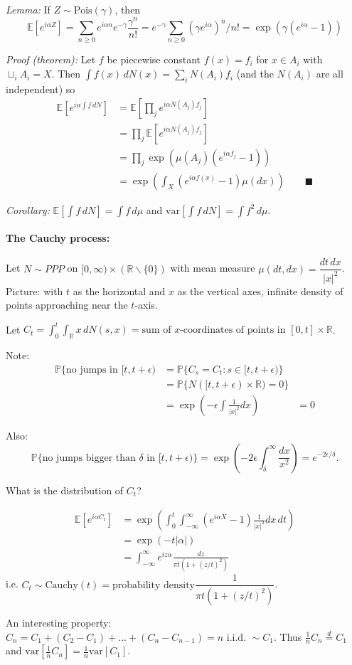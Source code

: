 \documentclass{article}
\begin{document}
\textit{Lemma:} If $Z\sim\textrm{Pois}(\gamma)$, then 
$$\mathbb{E}[e^{i\alpha Z}]=\sum_{n\geq0}e^{i\alpha n}e^{-\gamma}\frac{\gamma^n}{n!}=e^{-\gamma}\sum_{n\geq 0}(\gamma e^{i\alpha})^n/n!=\exp(\gamma(e^{i\alpha}-1))$$


\textit{Proof (theorem):} Let $f$ be piecewise constant $f(x)=f_i$ for $x\in A_i$ with $\sqcup_i A_i=X$. Then $\int f(x)\,dN(x)=\sum_i N(A_i)f_i$ (and the $N(A_i)$ are all independent) so 
$$\begin{split}
\mathbb{E}[e^{i\alpha \int f\,dN}]&=\mathbb{E}\left[\prod_je^{i\alpha N(A_j)f_j}\right]\\
&=\prod_j\mathbb{E}[e^{i\alpha N(A_j)f_j}]\\
&=\prod_j\exp(\mu(A_j)(e^{i\alpha f_j}-1))\\
&=\exp\left( \int_X(e^{i\alpha f(x)}-1)\mu(dx) \right)  \qquad \blacksquare
\end{split}$$


\emph{Corollary:} $\mathbb{E}[\int f\,dN]=\int f\,d\mu$ and $\textrm{var}[\int f\,dN]=\int f^2\,d\mu$.

\paragraph{The Cauchy process:} 
Let $N\sim PPP$ on $[0,\infty)\times(\mathbb{R}\backslash\{0\})$ with mean measure $\mu(dt,dx)=\dfrac{dt\,dx}{|x|^2}$.
Picture: with $t$ as the horizontal and $x$ as the vertical axes, infinite density of points approaching near the $t$-axis.

Let $C_t=\int_0^t\int_\mathbb{R} x\,dN(s,x)=\textrm{sum of $x$-coordinates of points in $[0,t]\times\mathbb{R}$}$. 

Note: 
$$\begin{split}
    \mathbb{P}\{\textrm{no jumps in $[t,t+\epsilon)$}&=\mathbb{P}\{C_s=C_t:s\in[t,t+\epsilon)\}\\
        &=\mathbb{P}\{N([t,t+\epsilon)\times\mathbb{R})=0\}\\
        &=\exp\left(-\epsilon\int\frac{1}{|x|^2}dx\right)
        &=0
\end{split}$$

Also:
$$\mathbb{P}\{\textrm{no jumps bigger than $\delta$ in $[t,t+\epsilon)$}\}=\exp\left(-2\epsilon\int_\delta^\infty\frac{dx}{x^2}\right)=e^{-2\epsilon/\delta}.$$


What is the distribution of $C_t$?

$$\begin{split}
    \mathbb{E}[e^{i\alpha C_t}]&=\exp\left( \int_0^t\int_{-\infty}^\infty(e^{i\alpha X}-1)\frac{1}{|x|^2}dx\,dt  \right)\\
        &=\exp(-t|\alpha|)\\
        &=\int_{-\infty}^\infty e^{iz\alpha}\frac{dz}{\pi t(1+(z/t)^2)}
\end{split}$$
i.e. $C_t\sim\textrm{Cauchy}(t)=\textrm{probability density}\dfrac{1}{\pi t(1+(z/t)^2)}$.

An interesting property: $C_n=C_1+(C_2-C_1)+...+(C_n-C_{n-1})=n\textrm{ i.i.d. }\sim C_1$. Thus $\frac{1}{n}C_n\overset{d}{=}C_1$ and $\textrm{var}[\frac{1}{n}C_n]=\frac{1}{n}\textrm{var}[C_1]$.

%
\end{document}
